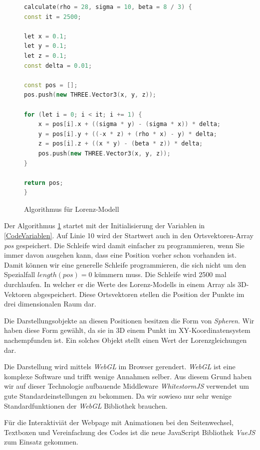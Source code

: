 \begin{figure}
	\begin{lstlisting}[style=C, language=C++]
calculate(rho = 28, sigma = 10, beta = 8 / 3) {
const it = 2500;

let x = 0.1;
let y = 0.1;
let z = 0.1;
const delta = 0.01;

const pos = [];
pos.push(new THREE.Vector3(x, y, z));

for (let i = 0; i < it; i += 1) {
	x = pos[i].x + ((sigma * y) - (sigma * x)) * delta;
	y = pos[i].y + ((-x * z) + (rho * x) - y) * delta;
	z = pos[i].z + ((x * y) - (beta * z)) * delta;
	pos.push(new THREE.Vector3(x, y, z));
}

return pos;
}
		\end{lstlisting}
		\caption{Algorithmus für Lorenz-Modell\label{AlgorithmusLorenz}}
\end{figure}


Der Algorithmus \ref{AlgorithmusLorenz} startet mit der Initialisierung der Variablen in \ref{CodeVariablen}. Auf Linie 10 wird der Startwert auch in den Ortsvektoren-Array \textit{pos} gespeichert. Die Schleife wird damit einfacher zu programmieren, wenn Sie immer davon ausgehen kann, dass eine Position vorher schon vorhanden ist. Damit können wir eine generelle Schleife programmieren, die sich nicht um den Spezialfall $ length(pos) = 0 $ kümmern muss.
Die Schleife wird 2500 mal durchlaufen. In welcher er die Werte des Lorenz-Modells in einem Array als 3D-Vektoren abgespeichert. Diese Ortsvektoren stellen die Position der Punkte im drei dimensionalen Raum dar.

Die Darstellungsobjekte an diesen Positionen besitzen die Form von \textit{Spheren}. Wir haben diese Form gewählt, da sie in 3D einem Punkt im XY-Koordinatensystem nachempfunden ist. Ein solches Objekt stellt einen Wert der Lorenzgleichungen dar.

Die Darstellung wird mittels \textit{WebGL}\cite{WebGL} im Browser gerendert. \textit{WebGL} ist eine komplexe Software und trifft wenige Annahmen selber. Aus diesem Grund haben wir auf dieser Technologie aufbauende Middleware \textit{WhitestormJS}\cite{whitestormJS} verwendet um gute Standardeinstellungen zu bekommen. Da wir sowieso nur sehr wenige Standardfunktionen der \textit{WebGL} Bibliothek brauchen.

Für die Interaktiviät der Webpage mit Animationen bei den Seitenwechsel, Textboxen und Vereinfachung des Codes ist die neue JavaScript Bibliothek \textit{VueJS}\cite{VueJS} zum Einsatz gekommen.

